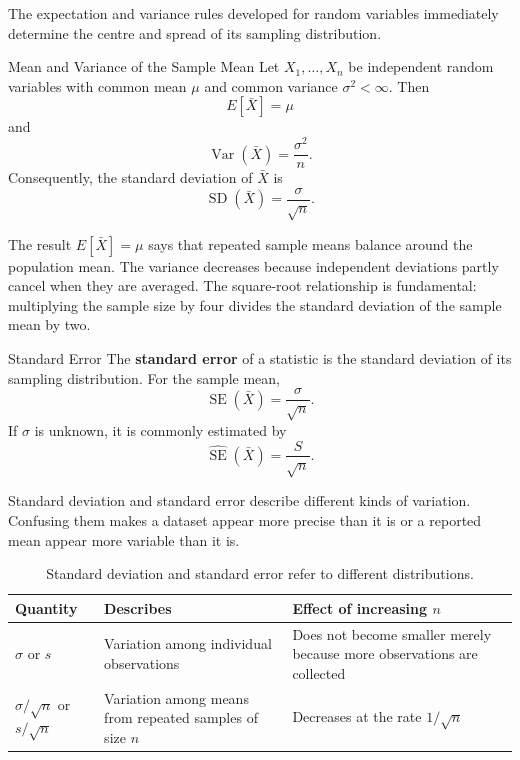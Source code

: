 The expectation and variance rules developed for random variables immediately determine the centre and spread of its sampling distribution.

\begin{theorem}{Mean and Variance of the Sample Mean}
Let $X_1,\ldots,X_n$ be independent random variables with common mean $\mu$ and common variance $\sigma^2<\infty$. Then
\[
    E[\bar X]=\mu
\]
and
\[
    \operatorname{Var}(\bar X)=\frac{\sigma^2}{n}.
\]
Consequently, the standard deviation of $\bar X$ is
\[
    \operatorname{SD}(\bar X)=\frac{\sigma}{\sqrt n}.
\]
\end{theorem}

The result $E[\bar X]=\mu$ says that repeated sample means balance around the population mean. The variance decreases because independent deviations partly cancel when they are averaged. The square-root relationship is fundamental: multiplying the sample size by four divides the standard deviation of the sample mean by two.

\begin{definition}{Standard Error}
The \textbf{standard error} of a statistic is the standard deviation of its sampling distribution. For the sample mean,
\[
    \operatorname{SE}(\bar X)=\frac{\sigma}{\sqrt n}.
\]
If $\sigma$ is unknown, it is commonly estimated by
\[
    \widehat{\operatorname{SE}}(\bar X)=\frac{S}{\sqrt n}.
\]
\end{definition}

Standard deviation and standard error describe different kinds of variation. Confusing them makes a dataset appear more precise than it is or a reported mean appear more variable than it is.

\begin{table}[htbp]
\centering
\caption{Standard deviation and standard error refer to different distributions.}
\label{tab:sd-versus-se}
\begin{tabularx}{\textwidth}{@{}l>{\raggedright\arraybackslash}X>{\raggedright\arraybackslash}X@{}}
\toprule
Quantity & Describes & Effect of increasing $n$ \\
\midrule
$\sigma$ or $s$
& Variation among individual observations
& Does not become smaller merely because more observations are collected \\
$\sigma/\sqrt n$ or $s/\sqrt n$
& Variation among means from repeated samples of size $n$
& Decreases at the rate $1/\sqrt n$ \\
\bottomrule
\end{tabularx}
\end{table}

